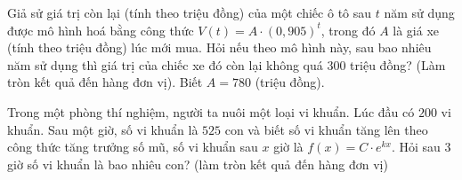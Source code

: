\begin{ex}%
    Giả sử giá trị còn lại (tính theo triệu đồng) của một chiếc ô tô sau $t$ năm sử dụng được mô hình hoá bằng công thức $V(t)=A \cdot(0{,}905)^t$, trong đó $A$ là giá xe (tính theo triệu đồng) lúc mới mua. Hỏi nếu theo mô hình này, sau bao nhiêu năm sử dụng thì giá trị của chiếc xe đó còn lại không quá $300$ triệu đồng? (Làm tròn kết quả đến hàng đơn vị). Biết $A=780$ (triệu đồng).
\end{ex}

\begin{ex}%
	Trong một phòng thí nghiệm, người ta nuôi một loại vi khuẩn. Lúc đầu có $200$ vi khuẩn. Sau một giờ, số vi khuẩn là $525$ con và biết số vi khuẩn tăng lên theo công thức tăng trưởng số mũ, số vi khuẩn sau $x$ giờ là $f(x)=C\cdot e^{kx}$. Hỏi sau $3$ giờ số vi khuẩn là bao nhiêu con? (làm tròn kết quả đến hàng đơn vị)
\end{ex}


